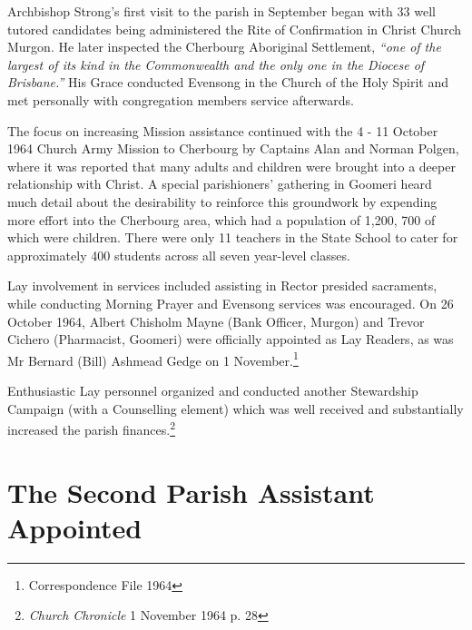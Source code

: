 Archbishop Strong's first visit to the parish in September began with 33 well tutored candidates being administered the Rite of Confirmation in Christ Church Murgon. He later inspected the Cherbourg Aboriginal Settlement, \emph{``one of the largest of its kind in the Commonwealth and the only one in the Diocese of Brisbane.''} His Grace conducted Evensong in the Church of the Holy Spirit and met personally with congregation members service afterwards.



The focus on increasing Mission assistance continued with the 4 - 11 October 1964 Church Army Mission to Cherbourg by Captains Alan and Norman Polgen, where it was reported that many adults and children were brought into a deeper relationship with Christ. A special parishioners' gathering in Goomeri heard much detail about the desirability to reinforce this groundwork by expending more effort into the Cherbourg area, which had a population of 1,200, 700 of which were children. There were only 11 teachers in the State School to cater for approximately 400 students across all seven year-level classes.



Lay involvement in services included assisting in Rector presided sacraments, while conducting Morning Prayer and Evensong services was encouraged. On 26 October 1964, Albert Chisholm Mayne (Bank Officer, Murgon) and Trevor Cichero (Pharmacist, Goomeri) were officially appointed as Lay Readers, as was Mr Bernard (Bill) Ashmead Gedge on 1 November.\footnote{Correspondence File 1964}


Enthusiastic Lay personnel organized and conducted another Stewardship Campaign (with a Counselling element) which was well received and substantially increased the parish finances.\footnote{\emph{Church Chronicle} 1 November 1964 p. 28}


\section{The Second Parish Assistant Appointed}









